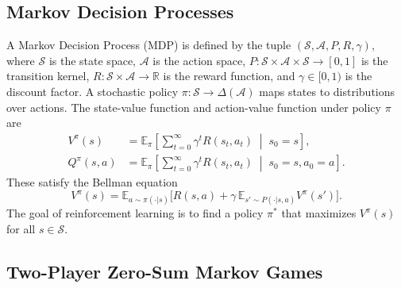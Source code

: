 \documentclass[conference]{IEEEtran}
\newcommand{\E}{\mathbb{E}}
\newcommand{\R}{\mathbb{R}}
\newcommand{\cS}{\mathcal{S}}
\newcommand{\cA}{\mathcal{A}}
\begin{document}
\subsection{Markov Decision Processes}\label{sec:bg_mdp}

A Markov Decision Process (MDP) is defined by the tuple
$(\cS, \cA, P, R, \gamma)$, where $\cS$ is the state space,
$\cA$ is the action space, $P: \cS \times \cA \times \cS \to [0,1]$ is
the transition kernel, $R: \cS \times \cA \to \R$ is the reward function,
and $\gamma \in [0,1)$ is the discount factor.  A stochastic policy
$\pi: \cS \to \Delta(\cA)$ maps states to distributions over actions.  The
state-value function and action-value function under policy $\pi$ are
\begin{align}
V^\pi(s) &= \E_\pi\!\left[\sum_{t=0}^{\infty}\gamma^t R(s_t, a_t)
  \;\middle|\; s_0 = s\right], \label{eq:value}\\
Q^\pi(s,a) &= \E_\pi\!\left[\sum_{t=0}^{\infty}\gamma^t R(s_t, a_t)
  \;\middle|\; s_0 = s, a_0 = a\right]. \label{eq:qvalue}
\end{align}
These satisfy the Bellman equation
\begin{equation}\label{eq:bellman}
V^\pi(s) = \E_{a\sim\pi(\cdot|s)}\!\Big[R(s,a) +
  \gamma\,\E_{s'\sim P(\cdot|s,a)}V^\pi(s')\Big].
\end{equation}
The goal of reinforcement learning is to find a policy $\pi^*$ that
maximizes $V^\pi(s)$ for all $s \in \cS$.

\subsection{Two-Player Zero-Sum Markov Games}\label{sec:bg_game}
\end{document}
